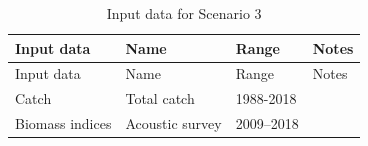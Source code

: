 \documentclass[
]{article}
\begin{document}
\begin{longtable}[]{@{}llll@{}}
\caption{Input data for Scenario 3}\tabularnewline
\toprule
\begin{minipage}[b]{0.21\columnwidth}\raggedright
Input data\strut
\end{minipage} & \begin{minipage}[b]{0.20\columnwidth}\raggedright
Name\strut
\end{minipage} & \begin{minipage}[b]{0.15\columnwidth}\raggedright
Range\strut
\end{minipage} & \begin{minipage}[b]{0.33\columnwidth}\raggedright
Notes\strut
\end{minipage}\tabularnewline
\midrule
\endfirsthead
\toprule
\begin{minipage}[b]{0.21\columnwidth}\raggedright
Input data\strut
\end{minipage} & \begin{minipage}[b]{0.20\columnwidth}\raggedright
Name\strut
\end{minipage} & \begin{minipage}[b]{0.15\columnwidth}\raggedright
Range\strut
\end{minipage} & \begin{minipage}[b]{0.33\columnwidth}\raggedright
Notes\strut
\end{minipage}\tabularnewline
\midrule
\endhead
\begin{minipage}[t]{0.21\columnwidth}\raggedright
Catch\strut
\end{minipage} & \begin{minipage}[t]{0.20\columnwidth}\raggedright
Total catch\strut
\end{minipage} & \begin{minipage}[t]{0.15\columnwidth}\raggedright
1988-2018\strut
\end{minipage} & \begin{minipage}[t]{0.33\columnwidth}\raggedright
\strut
\end{minipage}\tabularnewline
\begin{minipage}[t]{0.21\columnwidth}\raggedright
Biomass indices\strut
\end{minipage} & \begin{minipage}[t]{0.20\columnwidth}\raggedright
Acoustic survey\strut
\end{minipage} & \begin{minipage}[t]{0.15\columnwidth}\raggedright
2009--2018\strut
\end{minipage} & \begin{minipage}[t]{0.33\columnwidth}\raggedright

\end{minipage}
\end{longtable}
\end{document}
